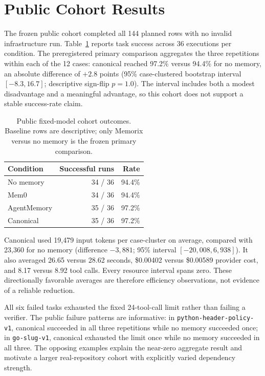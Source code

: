 \section{Public Cohort Results}
\label{sec:public-results}

The frozen public cohort completed all 144 planned rows with no invalid
infrastructure run. Table~\ref{tab:public-success} reports task success across
36 executions per condition. The preregistered primary comparison aggregates
the three repetitions within each of the 12 cases: canonical \memorix{} reached
97.2\% versus 94.4\% for no memory, an absolute difference of $+2.8$ points
(95\% case-clustered bootstrap interval $[-8.3, 16.7]$; descriptive sign-flip
$p=1.0$). The interval includes both a modest disadvantage and a meaningful
advantage, so this cohort does not support a stable success-rate claim.

\begin{table}[t]
\centering
\small
\caption{Public fixed-model cohort outcomes. Baseline rows are descriptive;
only Memorix versus no memory is the frozen primary comparison.}
\label{tab:public-success}
\begin{tabular}{lrr}
\toprule
Condition & Successful runs & Rate \\
\midrule
No memory & 34 / 36 & 94.4\% \\
Mem0 & 34 / 36 & 94.4\% \\
AgentMemory & 35 / 36 & 97.2\% \\
Canonical \memorix{} & 35 / 36 & 97.2\% \\
\bottomrule
\end{tabular}
\end{table}

Canonical \memorix{} used 19,479 input tokens per case-cluster on average,
compared with 23,360 for no memory (difference $-3{,}881$; 95\% interval
$[-20{,}008, 6{,}938]$). It also averaged 26.65 versus 28.62 seconds,
\$0.00402 versus \$0.00589 provider cost, and 8.17 versus 8.92 tool calls.
Every resource interval spans zero. These directionally favorable averages are
therefore efficiency observations, not evidence of a reliable reduction.

All six failed tasks exhausted the fixed 24-tool-call limit rather than failing
a verifier. The public failure patterns are informative: in
\texttt{python-header-policy-v1}, canonical \memorix{} succeeded in all three
repetitions while no memory succeeded once; in \texttt{go-slug-v1}, canonical
\memorix{} exhausted the limit once while no memory succeeded in all three.
The opposing examples explain the near-zero aggregate result and motivate a
larger real-repository cohort with explicitly varied dependency strength.


